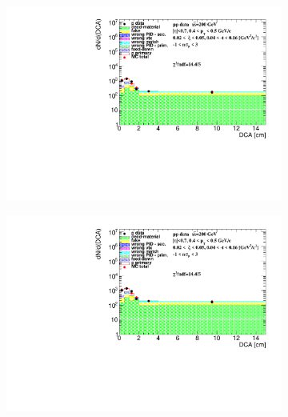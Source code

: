 \begin{figure}[h!]
\begin{subfigure}{.45\textwidth}
	\end{subfigure}
	\begin{subfigure}{.45\textwidth}
		\includegraphics[width=\linewidth, page=10]{chapters/chrgSTAR/img/DCAproton/background_p_0.pdf}
	\end{subfigure}
	\begin{subfigure}{.45\textwidth}
		\includegraphics[width=\linewidth, page=13]{chapters/chrgSTAR/img/DCAproton/background_p_0.pdf}
	\end{subfigure}
	\begin{subfigure}{.45\textwidth}

\end{subfigure}
\end{figure}

